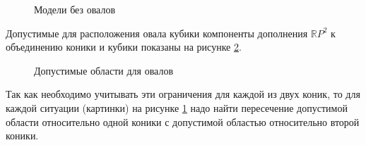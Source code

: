 \documentclass[11pt]{book}
\numberwithin{exercise}{chapter}
\begin{document}
\begin{figure}[H]
\caption{Модели без овалов}
\label{fig:curves_without_ovals}
\end{figure}
Допустимые для расположения овала кубики компоненты дополнения $\mathbb RP^2$ к объединению коники и кубики показаны на рисунке \ref{fig:ovals_and_loc_of_odd_brunch}.

\begin{figure}[H]
\caption{Допустимые области для овалов}
\label{fig:ovals_and_loc_of_odd_brunch}
\end{figure}

Так как необходимо учитывать эти ограничения для каждой из двух коник, то для каждой ситуации (картинки) на рисунке \ref{fig:curves_without_ovals} надо найти пересечение допустимой области относительно одной коники с допустимой областью относительно второй коники.
\end{document}

